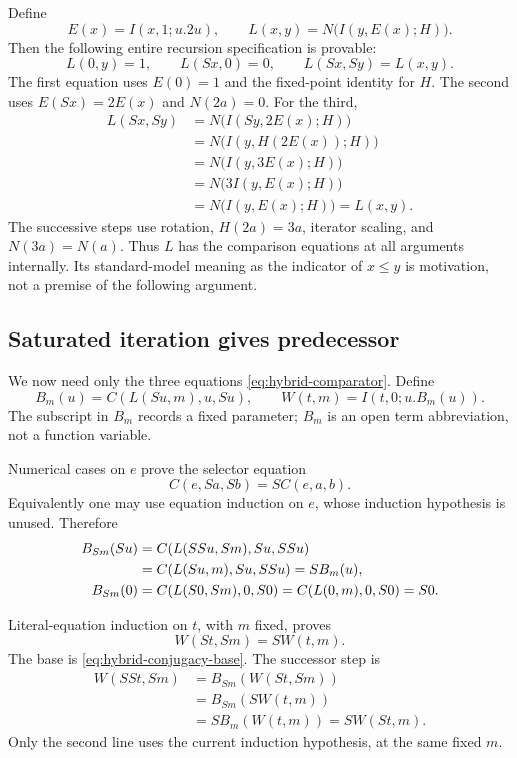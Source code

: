 \documentclass[11pt,letterpaper]{article}
\theoremstyle{definition}\newtheorem{definition}[theorem]{Definition}
\theoremstyle{remark}\newtheorem{remark}[theorem]{Remark}
\begin{document}
Define
\[
 E(x)=I(x,1;u.2u),\qquad
 L(x,y)=N\bigl(I(y,E(x);H)\bigr).
\]
Then the following entire recursion specification is provable:
\begin{equation}
 L(0,y)=1,\qquad L(Sx,0)=0,\qquad L(Sx,Sy)=L(x,y).
 \label{eq:hybrid-comparator}
\end{equation}
The first equation uses $E(0)=1$ and the fixed-point identity for
$H$.  The second uses $E(Sx)=2E(x)$ and $N(2a)=0$.
For the third,
\begin{align*}
 L(Sx,Sy)
 &=N\bigl(I(Sy,2E(x);H)\bigr)\\
 &=N\bigl(I(y,H(2E(x));H)\bigr)\\
 &=N\bigl(I(y,3E(x);H)\bigr)\\
 &=N\bigl(3I(y,E(x);H)\bigr)\\
 &=N\bigl(I(y,E(x);H)\bigr)=L(x,y).
\end{align*}
The successive steps use rotation, $H(2a)=3a$, iterator scaling,
and $N(3a)=N(a)$.  Thus $L$ has the comparison equations at all
arguments internally.  Its standard-model meaning as the indicator
of $x\le y$ is motivation, not a premise of the following argument.

\subsection{Saturated iteration gives predecessor}

We now need only the three equations
\eqref{eq:hybrid-comparator}.  Define
\[
 B_m(u)=C(L(Su,m),u,Su),\qquad
 W(t,m)=I(t,0;u.B_m(u)).
\]
The subscript in $B_m$ records a fixed parameter; $B_m$ is an open
term abbreviation, not a function variable.

Numerical cases on $e$ prove the selector equation
\[
 C(e,Sa,Sb)=S C(e,a,b).
\]
Equivalently one may use equation induction on $e$, whose induction
hypothesis is unused.  Therefore
\begin{align}
 B_{Sm}(Su)
 &=C(L(SSu,Sm),Su,SSu)\notag\\
 &=C(L(Su,m),Su,SSu)=S B_m(u),
 \label{eq:hybrid-conjugacy}\\
 B_{Sm}(0)&=C(L(S0,Sm),0,S0)=C(L(0,m),0,S0)=S0.
 \label{eq:hybrid-conjugacy-base}
\end{align}

Literal-equation induction on $t$, with $m$ fixed, proves
\begin{equation}
 W(St,Sm)=S W(t,m).
 \label{eq:hybrid-saturated-shift}
\end{equation}
The base is \eqref{eq:hybrid-conjugacy-base}.  The successor step is
\begin{align*}
 W(SSt,Sm)
 &=B_{Sm}(W(St,Sm))\\
 &=B_{Sm}(S W(t,m))\\
 &=S B_m(W(t,m))=S W(St,m).
\end{align*}
Only the second line uses the current induction hypothesis, at the
same fixed $m$.
\end{document}
